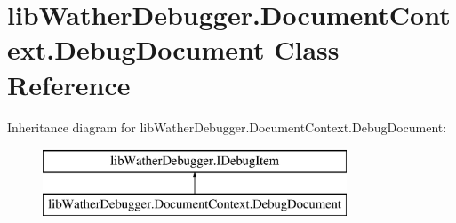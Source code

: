 \hypertarget{classlib_wather_debugger_1_1_document_context_1_1_debug_document}{\section{lib\+Wather\+Debugger.\+Document\+Context.\+Debug\+Document Class Reference}
\label{classlib_wather_debugger_1_1_document_context_1_1_debug_document}
}
Inheritance diagram for lib\+Wather\+Debugger.\+Document\+Context.\+Debug\+Document\+:\begin{figure}[H]
\begin{center}
\leavevmode
\includegraphics[height=2.000000cm]{classlib_wather_debugger_1_1_document_context_1_1_debug_document}
\end{center}
\end{figure}

